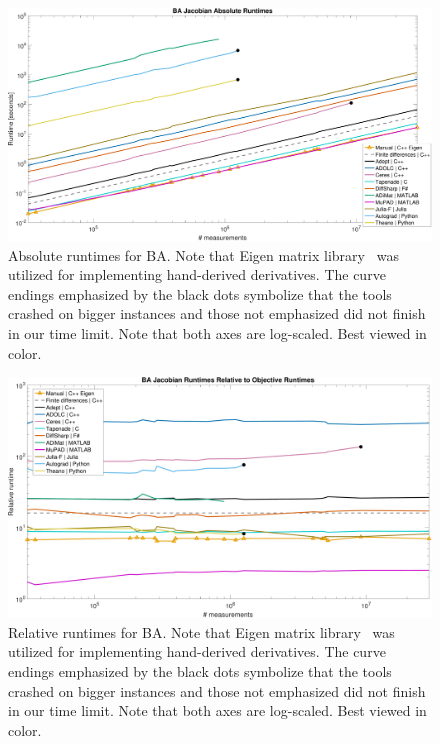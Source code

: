 \documentclass[suppldata]{article}
\begin{document}
\begin{figure}[ht]
    \includegraphics[width=\textwidth]{figs/ba-abs-legend}
    \caption{Absolute runtimes for BA. Note that Eigen matrix library~\cite{eigen} was utilized for implementing hand-derived derivatives. 
  The curve endings emphasized by the black dots symbolize that the tools crashed on bigger instances and those not emphasized did not finish in our time limit. 
  Note that both axes are log-scaled. Best viewed in color.}
    \label{fig:ba-abs}
\end{figure}

\begin{figure}[ht]
\vspace{-8mm}
    \includegraphics[width=\textwidth]{figs/ba-rel-legend}
    \caption{Relative runtimes for BA. Note that Eigen matrix library~\cite{eigen} was utilized for implementing hand-derived derivatives. 
  The curve endings emphasized by the black dots symbolize that the tools crashed on bigger instances and those not emphasized did not finish in our time limit. 
  Note that both axes are log-scaled. Best viewed in color.}
    \label{fig:ba-rel}
\end{figure}
\end{document}
